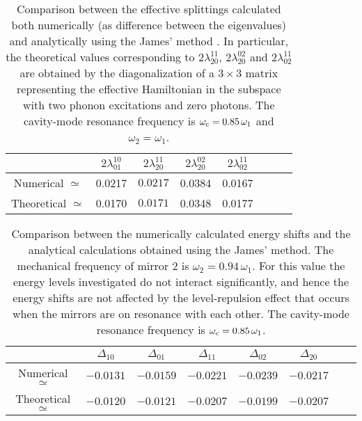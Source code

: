 \documentclass[aps,pra,twocolumn,floatfix,longbibliography, superscriptaddress]{revtex4-1}
\begin{document}
\begin{widetext}
	\begin{center}
\begin{table}[h!]
	\renewcommand\tabcolsep{10pt}
	\begin{tabular}{|*8{c|}}
		\hline
		& $2\lambda^{10}_{01}$ & $2\lambda_{20}^{11}$ & $2\lambda_{20}^{02}$ & $2\lambda^{11}_{02}$ \\
		\hline
		Numerical  $\simeq$& 0.0217& $0.0217$&0.0384&0.0167\\
		\hline
		Theoretical $\simeq$ &0.0170 &$ 0.0171$ &0.0348& 0.0177\\
		\hline
	\end{tabular}
	\caption{Comparison between the effective splittings calculated both numerically (as difference between the eigenvalues) and  analytically using the James' method \cite{ Shao2017}. 
		In particular, the theoretical  values corresponding to $2\lambda_{20}^{11}$, $2\lambda_{20}^{02}$ and $2\lambda^{11}_{02}$  are obtained by the diagonalization of a $3\times3$ matrix representing the effective Hamiltonian in the subspace with two phonon excitations and zero photons.
		The cavity-mode resonance frequency is $\omega_{\rm c}=0.85\, \omega_1$ and $\omega_2= \omega_1$.}
	\label{t1}
\end{table}
\end{center}
\end{widetext}

\begin{widetext}
	\begin{center}
\begin{table}[h!]
	\renewcommand\tabcolsep{10pt}
	\begin{tabular}{|*8{c|}}
		\hline
		&$ \Delta_{10}$  &$ \Delta_{01}$  & $\Delta_{11}$ & $\Delta_{02}$&$\Delta_{20}$ \\
		\hline
		Numerical $\simeq$ &$-0.0131$ & $-0.0159$ & $-0.0221$ & $-0.0239$ & $-0.0217$\\
		\hline
		Theoretical $\simeq$ & $-0.0120$ & $-0.0121$ & $ -0.0207$ & $-0.0199$ & $-0.0207$\\
		\hline
	\end{tabular}
	\caption{Comparison between the numerically calculated energy shifts and the analytical calculations obtained using the James' method. The mechanical frequency of mirror 2 is  $\omega_2=0.94\, \omega_1$. For this value the energy levels investigated do not interact significantly, and hence the energy shifts are not affected by the level-repulsion effect that occurs when the mirrors are on resonance with each other. The cavity-mode resonance frequency is $\omega_{\rm c}=0.85\, \omega_1$.}
	\label{t2}
\end{table}
\end{center}
\end{widetext}
\end{document}

